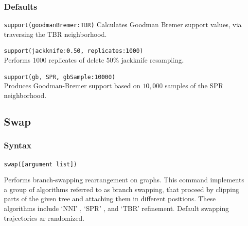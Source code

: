 	\subsubsection{Defaults}
		\texttt{support(goodmanBremer:TBR)} Calculates Goodman Bremer support values, 
		via traversing the TBR neighborhood.
		

		\begin{example}
			\item{\texttt{support(jackknife:0.50, replicates:1000)}\\Performs 1000 replicates of 
			delete 50\% jackknife resampling.}
				
			\item{\texttt{support(gb, SPR, gbSample:10000)}\\Produces Goodman-Bremer 
			support based on $10,000$ samples of the SPR neighborhood.}
		\end{example}

\subsection{Swap} 
	\subsubsection{Syntax}
		\texttt{swap([argument list])}
			
	\begin{phygdescription}
		{Performs branch-swapping rearrangement on graphs. This command implements a 
		group of algorithms referred to as branch swapping, that proceed by clipping
		parts of the given tree and attaching them in different positions. These algorithms 
		include `NNI' \citep{CaminandSokal1965, Robinson1971}, `SPR' \citep{Dayhoff1969}, 
		and `TBR' \citep{Farris1988, swofford1990a} refinement.  Default swapping trajectories ar randomized.}
	\end{phygdescription}
		
